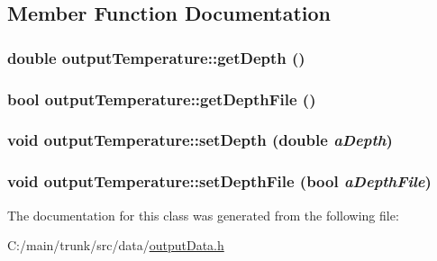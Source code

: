 \subsection{Member Function Documentation}
\hypertarget{classoutput_temperature_ae4591f00483c677d20ba6f8bb980e7c0}{
\subsubsection[{getDepth}]{\setlength{\rightskip}{0pt plus 5cm}double outputTemperature::getDepth ()}}
\label{classoutput_temperature_ae4591f00483c677d20ba6f8bb980e7c0}
\hypertarget{classoutput_temperature_a08778008ebcaaa296095048d92075d18}{
\subsubsection[{getDepthFile}]{\setlength{\rightskip}{0pt plus 5cm}bool outputTemperature::getDepthFile ()}}
\label{classoutput_temperature_a08778008ebcaaa296095048d92075d18}
\hypertarget{classoutput_temperature_ad59e59b683f9bd59644bb7dc82ac3043}{
\subsubsection[{setDepth}]{\setlength{\rightskip}{0pt plus 5cm}void outputTemperature::setDepth (double {\em aDepth})}}
\label{classoutput_temperature_ad59e59b683f9bd59644bb7dc82ac3043}
\hypertarget{classoutput_temperature_a7abf127444c75e7b4a175b1fc2e67e97}{
\subsubsection[{setDepthFile}]{\setlength{\rightskip}{0pt plus 5cm}void outputTemperature::setDepthFile (bool {\em aDepthFile})}}
\label{classoutput_temperature_a7abf127444c75e7b4a175b1fc2e67e97}


The documentation for this class was generated from the following file:\begin{DoxyCompactItemize}
\item 
C:/main/trunk/src/data/\hyperlink{output_data_8h}{outputData.h}\end{DoxyCompactItemize}
